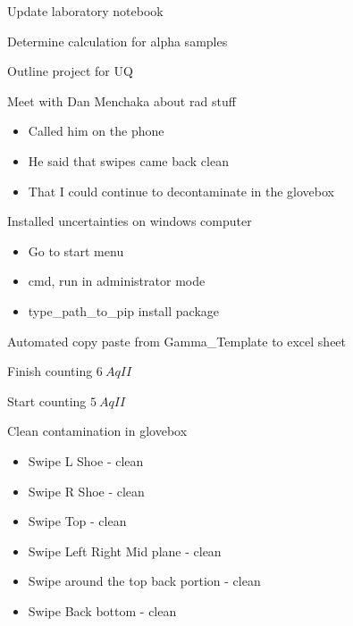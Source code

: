 \documentclass[idxtotoc,hyperref,openany,oneside]{labbook} %
\newcommand{\cmark}{\ding{51}}%
\newcommand{\done}{\rlap{$\square$}{\raisebox{2pt}{\large\hspace{1pt}\cmark}}%
  \hspace{-2.5pt}}
\begin{document}
 


\begin{todolist}
\item[\done]{Update laboratory notebook}
\item{Determine calculation for alpha samples}
\item{Outline project for UQ}
\item[\done]{Meet with Dan Menchaka about rad stuff}
  \begin{itemize}
  \item{Called him on the phone}
  \item{He said that swipes came back clean}
  \item{That I could continue to decontaminate in the glovebox}
  \end{itemize}
\item[\done]{Installed uncertainties on windows computer}
  \begin{itemize}
  \item{Go to start menu}
  \item{cmd, run in administrator mode}
  \item{type\_path\_to\_pip install package}
  \end{itemize}
\item[\done]{Automated copy paste from Gamma\_Template to excel
  sheet}
\end{todolist}


\begin{todolist}
\item[\done]{Finish counting $\boxed{6\ AqII}$}
\item[\done]{Start counting $\boxed{5\ AqII}$}
\end{todolist}




\begin{todolist}
\item[\done]{Clean contamination in glovebox}
  \begin{itemize}
  \item{Swipe L Shoe - clean}
  \item{Swipe R Shoe - clean}
  \item{Swipe Top    - clean}
  \item{Swipe Left Right Mid plane - clean}
  \item{Swipe around the top back portion - clean}
  \item{Swipe Back bottom - clean}
  \end{itemize}
\end{todolist}
\end{document}
